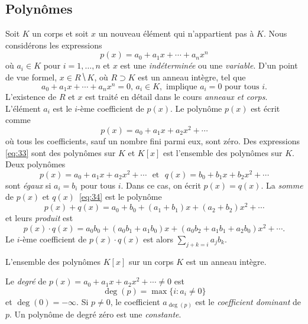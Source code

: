\subsection{Polynômes}
\label{sec:polynomes}
Soit $K$ un corps et soit $x$ un nouveau élément qui n'appartient pas à $K$. Nous considérons les expressions
\begin{equation}
  \label{eq:33}
  p(x) = a_0 + a_1 x + \cdots + a_n x^n
\end{equation}
où $a_i ∈K$ pour $i=1,\dots,n$ et $x$ est une \emph{indéterminée} ou une  \emph{variable}.
D'un point de vue formel, $x ∈ R ⧹K$, où $R⊃K$ est un anneau intègre, tel que
\begin{displaymath}
  a_0+ a_1x + \cdots + a_n x^n =0, \, a_i ∈K, \text{ implique } a_i=0 \text{ pour tous }i.  
\end{displaymath}
L'existence de $R$ et $x$ est traité en détail dans le cours \emph{anneaux et corps}. 
L'élément $a_i$ est le $i$-ème coefficient de $p(x)$. Le polynôme $p(x)$ est écrit comme
\begin{displaymath}
  p(x) = a_0 + a_1x + a_2x^2 + \cdots
\end{displaymath}
où tous les  coefficients, sauf un nombre fini parmi eux, sont zéro.
Des expressions \eqref{eq:33} sont des polynômes sur $K$  et $K[x]$ est l'ensemble des polynômes sur $K$. Deux polynômes
\begin{equation}
  \label{eq:34}
  p(x) = a_0 + a_1x + a_2x^2 + \cdots \,\,\text{ et }  \,\, q(x) = b_0 + b_1x + b_2x^2 + \cdots
  \end{equation}
  sont \emph{égaux} si $a_i  =b_i$ pour tous $i$. Dans ce cas, on écrit $p(x) = q(x)$.
La \emph{somme} de $p(x)$ et $q(x)$~\eqref{eq:34} est le polynôme
\begin{displaymath}
  p(x) + q(x)  = a_0+b_0 + (a_1+b_1)x + (a_2+b_2)x^2 + \cdots
\end{displaymath}
et leurs \emph{produit} est
\begin{equation}
  \label{ceq:21}
  p(x) ⋅q(x) = a_0 b_0 + (a_0b_1 +a_1b_0) x + (a_0b_2+ a_1b_1 + a_2b_0)x^2 + \cdots .
\end{equation}
Le $i$-ème coefficient de $p(x)⋅q(x)$ est alors  $∑_{j+k=i}a_jb_k$.

\begin{theorem}
  \label{thr:43}
  L'ensemble des polynômes $K[x]$ sur un corps $K$ est un anneau intègre.
\end{theorem}

Le \emph{degré} de $p(x) = a_0 + a_1x + a_2x^2 + \cdots \neq 0$ est 
\begin{displaymath}
  \deg(p) = \max\{i \colon  a_i \neq 0\}
\end{displaymath}
et $\deg(0) = -\infty$. 
Si $p \neq 0$, le coefficient $a_{\deg(p)}$ est le \emph{coefficient dominant} de $p$. 
Un polynôme de degré zéro est une \emph{constante}. 

